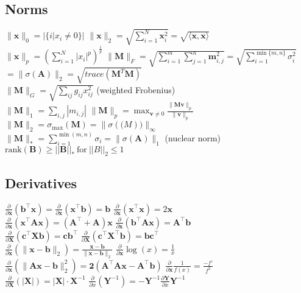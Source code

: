 \subsection*{Norms}
$\|\mathbf{x}\|_0 = |\{i | x_i \neq 0\}|$ \quad
$\|\mathbf{x}\|_2 = \sqrt{\sum_{i=1}^{N} \mathbf{x}_i^2} = \sqrt{\langle \mathbf{x}, \mathbf{x} \rangle}$ \\
$\|\mathbf{x}\|_p = \left( \sum_{i=1}^{N} |x_i|^p \right)^{\frac{1}{p}}$ \quad
$\|\mathbf{M}\|_F =\allowbreak \sqrt{\sum_{i=1}^{m} \sum_{j=1}^{n}\mathbf{m}_{i,j}^2} \allowbreak = \sqrt{\sum_{i=1}^{\min\{m, n\}} \sigma_i^2}$  $\allowbreak = \|\sigma(\mathbf{A})\|_2  = \sqrt{trace(\mathbf{M}^T\mathbf{M})} $\\
$\|\mathbf{M}\|_G=\sqrt{\sum_{ij}{g_{ij}x^2_{ij}}}$ (weighted Frobenius) \\
$\|\mathbf{M}\|_1 = \sum_{i,j} | m_{i,j}|$ \quad
$\|\mathbf{M}\|_p = \max_{\mathbf{v} \neq 0} \frac{\|\mathbf{M}\mathbf{v}\|_p}{\|\mathbf{v}\|_p}$ \\
$\|\mathbf{M}\|_2 = \sigma_{\text{max}}(\mathbf{M}) = \|\sigma(\mathbf(M))\|_\infty$ \\
$\|\mathbf{M}\|_* = \sum_{i=1}^{\min(m, n)} \sigma_i = \|\sigma(\mathbf{A})\|_1$ (nuclear norm) \\
$\text{rank}(\mathbf{B}) \geq ||\mathbf{B}||_* \ \text{for} \ ||B||_2 \leq 1$

\subsection*{Derivatives}
$\frac{\partial}{\partial \mathbf{x}}(\mathbf{b}^\top \mathbf{x}) = \frac{\partial}{\partial \mathbf{x}}(\mathbf{x}^\top \mathbf{b}) = \mathbf{b}$ \quad
$\frac{\partial}{\partial \mathbf{x}}(\mathbf{x}^\top \mathbf{x}) = 2\mathbf{x}$\\
$\frac{\partial}{\partial \mathbf{x}}(\mathbf{x}^\top \mathbf{A}\mathbf{x}) = (\mathbf{A}^\top + \mathbf{A})\mathbf{x}$ \quad
$\frac{\partial}{\partial \mathbf{x}}(\mathbf{b}^\top \mathbf{A}\mathbf{x}) = \mathbf{A}^\top \mathbf{b}$\\
$\frac{\partial}{\partial \mathbf{X}}(\mathbf{c}^\top \mathbf{X} \mathbf{b}) = \mathbf{c}\mathbf{b}^\top$ \quad
$\frac{\partial}{\partial \mathbf{X}}(\mathbf{c}^\top \mathbf{X}^\top \mathbf{b}) = \mathbf{b}\mathbf{c}^\top$\\
$\frac{\partial}{\partial \mathbf{x}}(\| \mathbf{x}-\mathbf{b} \|_2) = \frac{\mathbf{x}-\mathbf{b}}{\|\mathbf{x}-\mathbf{b}\|_2}$ \quad
$\frac{\partial}{\partial \mathbf{x}}\log(x) = \frac{1}{x}$ \\
$\frac{\partial}{\partial \mathbf{x}}(\|\mathbf{Ax - b}\|_2^2) = \mathbf{2(A^\top Ax-A^\top b)}$ \quad
$\frac{\partial}{\partial \mathbf{x}}\frac{1}{f(x)} = \frac{-f'}{f^2}$\\
$\frac{\partial}{\partial \mathbf{X}}(|\mathbf{X}|) = |\mathbf{X}|\cdot \mathbf{X}^{-1}$ \quad $\frac{\partial}{\partial x}(\mathbf{Y}^{-1}) = -\mathbf{Y}^{-1} \frac{\partial\mathbf{Y}}{\partial x} \mathbf{Y}^{-1}$

